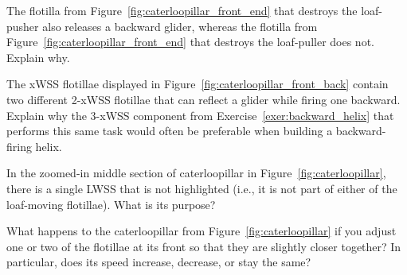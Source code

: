 \begin{multicols}{2}
\mfilbreak


\begin{problemstar}\label{exer:caterloopillar_front_end_glider}
	The flotilla from Figure~\ref{fig:caterloopillar_front_end} that destroys the loaf-pusher also releases a backward glider, whereas the flotilla from Figure~\ref{fig:caterloopillar_front_end} that destroys the loaf-puller does not. Explain why.
	
\end{problemstar}


\mfilbreak


\begin{problem}\label{exer:helix_components_from_caterloopillar}
	The xWSS flotillae displayed in Figure~\ref{fig:caterloopillar_front_back} contain two different 2-xWSS flotillae that can reflect a glider while firing one backward. Explain why the 3-xWSS component from Exercise~\ref{exer:backward_helix} that performs this same task would often be preferable when building a backward-firing helix.
\end{problem}


\mfilbreak


\begin{problem}\label{exer:caterloopillar_lonely_lwss}
	In the zoomed-in middle section of caterloopillar in Figure~\ref{fig:caterloopillar}, there is a single LWSS that is not highlighted (i.e., it is not part of either of the loaf-moving flotillae). What is its purpose?
\end{problem}


\mfilbreak


\begin{problem}\label{exer:caterloopillar_adjust_one_flotilla}
	What happens to the caterloopillar from Figure~\ref{fig:caterloopillar} if you adjust one or two of the flotillae at its front so that they are slightly closer together? In particular, does its speed increase, decrease, or stay the same?
\end{problem}



\end{multicols}
